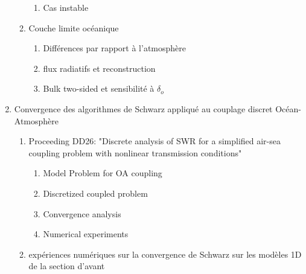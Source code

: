 \documentclass{article}
\begin{document}
\begin{enumerate}
\begin{enumerate}
\begin{enumerate}
				\item Cas instable
			\end{enumerate}
		\item Couche limite océanique
			\begin{enumerate}
				\item Différences par rapport à
					l'atmosphère
				\item flux radiatifs et reconstruction
				\item Bulk two-sided et sensibilité à
					$\delta_o$
			\end{enumerate}
	\end{enumerate}
\item Convergence des algorithmes de Schwarz appliqué au couplage
	discret Océan-Atmosphère
	\begin{enumerate}
	\item Proceeding DD26: "Discrete analysis of SWR for a
		simplified air-sea coupling problem
		with nonlinear transmission conditions"
		\begin{enumerate}
			\item Model Problem for OA coupling
			\item Discretized coupled problem
			\item Convergence analysis
			\item Numerical experiments
		\end{enumerate}
	\item expériences numériques sur la convergence de Schwarz
		sur les modèles 1D de la section d'avant
	\end{enumerate}
\end{enumerate}
\end{document}

